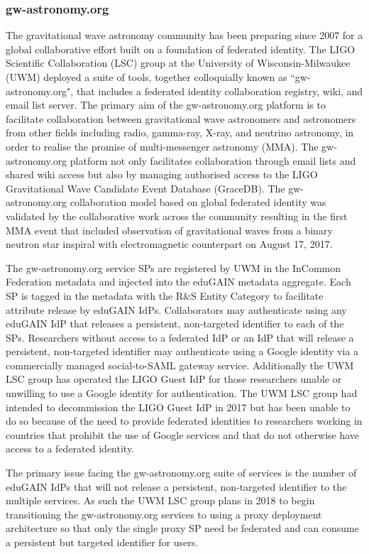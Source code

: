 \documentclass[fleqn,10pt]{wlscirep}
\begin{document}
{\subsubsection{gw-astronomy.org}
The gravitational wave astronomy community has been preparing since 2007 for a global collaborative effort built on a foundation of federated identity. The LIGO Scientific Collaboration (LSC) group at the University of Wisconsin-Milwaukee (UWM) deployed a suite of tools, together colloquially known as ``gw-astronomy.org", that includes a federated identity collaboration registry, wiki, and email list server. The primary aim of the gw-astronomy.org platform is to facilitate collaboration between gravitational wave astronomers and astronomers from other fields including radio, gamma-ray, X-ray, and neutrino astronomy, in order to realise the promise of multi-messenger astronomy (MMA). The gw-astronomy.org platform not only facilitates collaboration through email lists and shared wiki access but also by managing authorised access to the LIGO Gravitational Wave Candidate Event Database (GraceDB). The gw-astronomy.org collaboration model based on global federated identity was validated by the collaborative work across the community resulting in the first MMA event that included observation of gravitational waves from a binary neutron star inspiral with electromagnetic counterpart on August 17, 2017.

The gw-astronomy.org service SPs are registered by UWM in the InCommon Federation metadata and injected into the eduGAIN metadata aggregate. Each SP is tagged in the metadata with the R\&S Entity Category to facilitate attribute release by eduGAIN IdPs. Collaborators may authenticate using any eduGAIN IdP that releases a persistent, non-targeted identifier to each of the SPs. Researchers without access to a federated IdP or an IdP that will release a persistent, non-targeted identifier may authenticate using a Google identity via a commercially managed social-to-SAML gateway service. Additionally the UWM LSC group has operated the LIGO Guest IdP for those researchers unable or unwilling to use a Google identity for authentication. The UWM LSC group had intended to decommission the LIGO Guest IdP in 2017 but has been unable to do so because of the need to provide federated identities to researchers working in countries that prohibit the use of Google services and that do not otherwise have access to a federated identity.

The primary issue facing the gw-astronomy.org suite of services is the number of eduGAIN IdPs that will not release a persistent, non-targeted identifier to the multiple services. As such the UWM LSC group plans in 2018 to begin transitioning the gw-astronomy.org services to using a proxy deployment architecture so that only the single proxy SP need be federated and can consume a persistent but targeted identifier for users.


}
\end{document}
